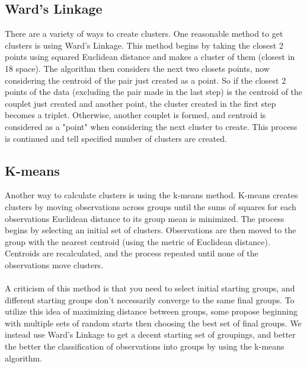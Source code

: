 \documentclass[11pt]{article}
\begin{document}
\subsection*{Ward's Linkage}
There are a variety of ways to create clusters. One reasonable method to get clusters is using Ward's Linkage. This method begins by taking the closest 2 points using squared Euclidean distance and makes a cluster of them (closest in 18 space). The algorithm then considers the next two closets points, now considering the centroid of the pair just created as a point. So if the closest 2 points of the data (excluding the pair made in the last step) is the centroid of the couplet just created and another point, the cluster created in the first step becomes a triplet. Otherwise, another couplet is formed, and centroid is considered as a "point" when considering the next cluster to create. This process is continued and tell specified number of clusters are created. 

\subsection*{K-means}
Another way to calculate clusters is using the k-means method. K-means creates clusters by moving observations across groups until the sums of squares for each observations Euclidean distance to its group mean is minimized. The process begins by selecting an initial set of clusters. Observations are then moved to the group with the nearest centroid (using the metric of Euclidean distance). Centroids are recalculated, and the process repeated until none of the observations move clusters.  
\\
\\
A criticism of this method is that you need to select initial starting groups, and different starting groups don't necessarily converge to the same final groups. To utilize this idea of maximizing distance between groups, some propose beginning with multiple sets of random starts then choosing the best set of final groups. We instead use Ward's Linkage to get a decent starting set of groupings, and better the better the classification of observations into groups by using the k-means algorithm.
\end{document}
